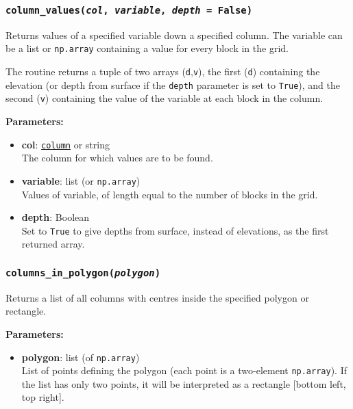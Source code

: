 \begin{snugshade}\subsubsection{\texttt{column\_values(\emph{col}, \emph{variable}, \emph{depth} = False)}}\end{snugshade}
\label{sec:mulgrid:column_values}

Returns values of a specified variable down a specified column.  The variable can be a list or \texttt{np.array} containing a value for every block in the grid.

The routine returns a tuple of two arrays (\texttt{d},\texttt{v}), the first (\texttt{d}) containing the elevation (or depth from surface if the \texttt{depth} parameter is set to \texttt{True}), and the second (\texttt{v}) containing the value of the variable at each block in the column.

\textbf{Parameters:}
\begin{itemize}
\item \textbf{col}: \hyperref[columnobjects]{\texttt{column}} or string\\
  The column for which values are to be found.
\item \textbf{variable}: list (or \texttt{np.array})\\
  Values of variable, of length equal to the number of blocks in the grid.
\item \textbf{depth}: Boolean\\
  Set to \texttt{True} to give depths from surface, instead of elevations, as the first returned array.
\end{itemize}

\begin{snugshade}\subsubsection{\texttt{columns\_in\_polygon(\emph{polygon})}}\end{snugshade}
\label{sec:mulgrid:columns_in_polygon}

Returns a list of all columns with centres inside the specified polygon or rectangle.

\textbf{Parameters:}
\begin{itemize}
\item \textbf{polygon}: list (of \texttt{np.array})\\
  List of points defining the polygon (each point is a two-element \texttt{np.array}).  If the list has only two points, it will be interpreted as a rectangle [bottom left, top right].
\end{itemize}

